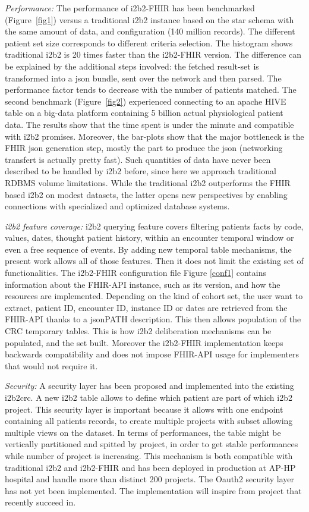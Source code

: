 \documentclass{amia}
\begin{document}
\textit{Performance:} The performance of i2b2-FHIR has been benchmarked (Figure~\ref{fig1}) versus a traditional i2b2 instance based on the star schema with the same amount of data, and configuration (140 million records). The different patient set size corresponds to different criteria selection. The histogram shows traditional i2b2 is 20 times faster than the i2b2-FHIR version. The difference can be explained by the additional steps involved: the fetched result-set is transformed into a json bundle, sent over the network and then parsed. The performance factor tends to decrease with the number of patients matched. The second benchmark (Figure~\ref{fig2}) experienced connecting to an apache HIVE table on a big-data platform containing 5 billion actual physiological patient data. The results show that the time spent is under the minute and compatible with i2b2 promises. Moreover, the bar-plots show that the major bottleneck is the FHIR json generation step, mostly the part to produce the json (networking transfert is actually pretty fast). Such quantities of data have never been described to be handled by i2b2 before, since here we approach traditional RDBMS volume limitations. While the traditional i2b2 outperforms the FHIR based i2b2 on modest datasets, the latter opens new perspectives by enabling connections with specialized and optimized database systems.


\textit{i2b2 feature coverage: }i2b2 querying feature covers filtering patients facts by code, values, dates, thought patient history, within an encounter temporal window or even a free sequence of events. By adding new temporal table mechanisms, the present work allows all of those features. Then it does not limit the existing set of functionalities. The i2b2-FHIR configuration file Figure \ref{conf1} contains information about the FHIR-API instance, such as its version, and how the resources are implemented. Depending on the kind of cohort set, the user want to extract, patient ID, encounter ID, instance ID or dates are retrieved from the FHIR-API thanks to a jsonPATH description. This then allows population of the CRC temporary tables. This is how i2b2 deliberation mechanisms can be populated, and the set built. Moreover the i2b2-FHIR implementation keeps backwards compatibility and does not impose FHIR-API usage for implementers that would not require it.

\textit{Security:} A security layer has been proposed and implemented into the existing i2b2crc. A new i2b2 table allows to define which patient are part of which i2b2 project. This security layer is important because it allows with one endpoint containing all patients records, to create multiple projects with subset allowing multiple views on the dataset. In terms of performances, the table might be vertically partitioned and spitted by project, in order to get stable performances while number of project is increasing. This mechanism is both compatible with traditional i2b2 and i2b2-FHIR and has been deployed in production at AP-HP hospital and handle more than distinct 200 projects. The Oauth2 security layer has not yet been implemented. The implementation will inspire from project\cite{Wagholikar_2016,Pfiffner__2016} that recently succeed in.
\end{document}
